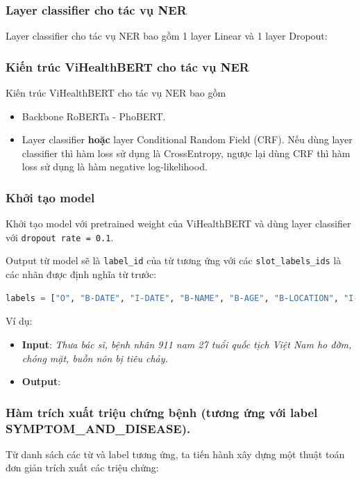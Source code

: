 \subsubsection{Layer classifier cho tác vụ NER}
Layer classifier cho tác vụ NER bao gồm 1 layer Linear và 1 layer Dropout:


\subsubsection{Kiến trúc ViHealthBERT cho tác vụ NER}
Kiến trúc ViHealthBERT cho tác vụ NER bao gồm 
\begin{itemize}
\item Backbone RoBERTa - PhoBERT.
\item Layer classifier \textbf{hoặc} layer Conditional Random Field (CRF). Nếu dùng layer classifier thì hàm loss sử dụng là CrossEntropy, ngược lại dùng CRF thì hàm loss sử dụng là hàm negative log-likelihood.
\end{itemize}



\subsubsection{Khởi tạo model}
Khởi tạo model với pretrained weight của ViHealthBERT và dùng layer classifier với \texttt{dropout rate = 0.1}.


Output từ model sẽ là \texttt{label\_id} của từ tương ứng với các \texttt{slot\_labels\_ids} là các nhãn được định nghĩa từ trước:
\begin{lstlisting}[language=Python]
labels = ["O", "B-DATE", "I-DATE", "B-NAME", "B-AGE", "B-LOCATION", "I-LOCATION", "B-JOB", "I-JOB","B-ORGANIZATION", "I-ORGANIZATION", "B-PATIENT_ID", "B-SYMPTOM_AND_DISEASE", "I-SYMPTOM_AND_DISEASE","B-GENDER", "B-TRANSPORTATION", "I-TRANSPORTATION", "I-NAME", "I-PATIENT_ID", "I-AGE", "I-GENDER"]
\end{lstlisting}
Ví dụ:
\begin{itemize}
\item \textbf{Input}: \textit{Thưa bác sĩ, bệnh nhân 911 nam 27 tuổi quốc tịch Việt Nam ho đờm, chóng mặt, buồn nôn bị tiêu chảy.}
\item \textbf{Output}:
\vietnameselst

\end{itemize}

\subsubsection{Hàm trích xuất triệu chứng bệnh (tương ứng với label \textbf{SYMPTOM\_AND\_DISEASE}).}
Từ danh sách các từ và label tương ứng, ta tiến hành xây dựng một thuật toán đơn giản trích xuất các triệu chứng:

